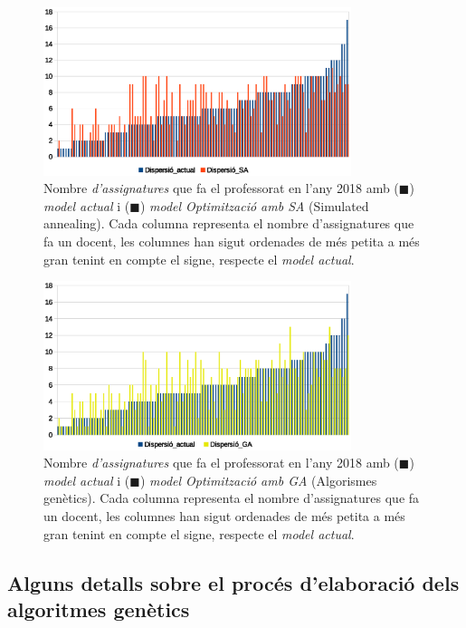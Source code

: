 \documentclass[10pt,twocolumn]{article}
\begin{document}
	\begin{figure}[ht]
		\centering
		\includegraphics[width=9cm]{disp_sorted_sa}
		\caption{ \small Nombre \textit{d'assignatures} que fa el professorat en l'any 2018 amb  ({\color{blue!70}$\blacksquare$}) \textit{model actual} i ({\color{orange!70!red!90}$\blacksquare$}) \textit{model Optimització amb SA} (Simulated annealing). Cada columna representa el nombre d'assignatures que fa un docent, les columnes han sigut ordenades de més petita a més gran tenint en compte el signe, respecte el \textit{model actual}. }
		\label{fig:sor}
	\end{figure}
	\begin{figure}[ht]
		\centering
		\includegraphics[width=9cm]{disp_sorted_ga}
		\caption{ \small  Nombre \textit{d'assignatures} que fa el professorat en l'any 2018 amb  ({\color{blue!70}$\blacksquare$}) \textit{model actual} i ({\color{yellow!70!gray!90}$\blacksquare$}) \textit{model Optimització amb GA} (Algorismes genètics). Cada columna representa el nombre d'assignatures que fa un docent, les columnes han sigut ordenades de més petita a més gran tenint en compte el signe, respecte el \textit{model actual}. }
		\label{fig:sorted_mo}
	\end{figure}
\subsection{Alguns detalls sobre el procés d'elaboració dels algoritmes genètics}
 
\end{document}
